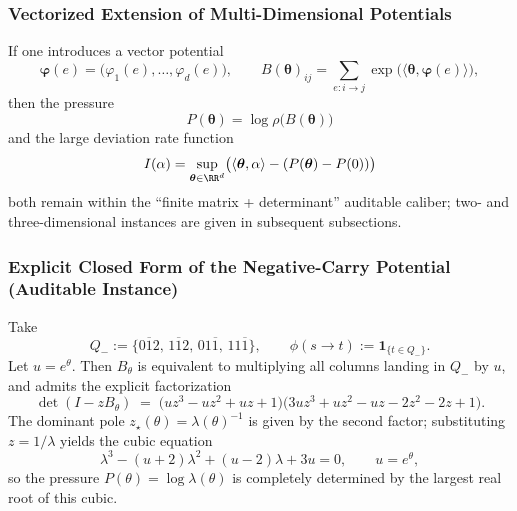 \subsubsection{Vectorized Extension of Multi-Dimensional Potentials}\label{app:vector-potential}
If one introduces a vector potential
\[
\boldsymbol{\varphi}(e)=\bigl(\varphi_1(e),\dots,\varphi_d(e)\bigr),
\qquad
B(\boldsymbol{\theta})_{ij}=\sum_{e:i\to j}\exp\!\bigl(\langle\boldsymbol{\theta},\boldsymbol{\varphi}(e)\rangle\bigr),
\]
then the pressure
\[
P(\boldsymbol{\theta})=\log\rho\bigl(B(\boldsymbol{\theta})\bigr)
\]
and the large deviation rate function
\[
I(\alpha)=\sup_{\boldsymbol{\theta}\in\RR^d}\bigl(\langle\boldsymbol{\theta},\alpha\rangle-(P(\boldsymbol{\theta})-P(0))\bigr)
\]
both remain within the ``finite matrix + determinant'' auditable caliber; two- and three-dimensional instances are given in subsequent subsections.

\subsubsection{Explicit Closed Form of the Negative-Carry Potential (Auditable Instance)}
Take
\[
Q_-:=\{0\overline{1}2,\,1\overline{1}2,\,01\overline{1},\,11\overline{1}\},
\qquad
\phi(s\to t):=\mathbf{1}_{\{t\in Q_-\}}.
\]
Let $u=e^\theta$. Then $B_\theta$ is equivalent to multiplying all columns landing in $Q_-$ by $u$, and admits the explicit factorization
\[
\det(I-zB_\theta)
\;=\;
\bigl(u z^3-u z^2+u z+1\bigr)\bigl(3u z^3+u z^2-u z-2z^2-2z+1\bigr).
\]
The dominant pole $z_\star(\theta)=\lambda(\theta)^{-1}$ is given by the second factor; substituting $z=1/\lambda$ yields the cubic equation
\[
\lambda^3-(u+2)\lambda^2+(u-2)\lambda+3u=0,\qquad u=e^\theta,
\]
so the pressure $P(\theta)=\log\lambda(\theta)$ is completely determined by the largest real root of this cubic.

